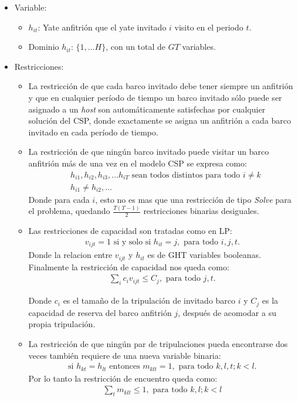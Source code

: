 \documentclass[letter, 10pt]{article}
\begin{document}
\begin{itemize}
    \item Variable:
    \begin{itemize}
        \item $h_{it}$: Yate anfitrión que el yate invitado $i$ visito en el periodo $t$.
        \item Dominio $h_{it}$: $\{1,\ldots H \}$, con un total de $GT$ variables.
    \end{itemize}
    \item Restricciones:
    \begin{itemize}
        \item La restricción de que cada barco invitado debe tener siempre un anfitrión y que en cualquier período de tiempo un barco invitado sólo puede ser asignado a un \textit{host} son automáticamente satisfechas por cualquier solución del CSP, donde exactamente se asigna un anfitrión a cada barco invitado en cada período de tiempo.
        \item La restricción de que ningún barco invitado puede visitar un barco anfitrión más de una vez en el modelo CSP se expresa como:
        \begin{align*}
            &h_{i1},h_{i2},h_{i3},\ldots h_{iT} \text{ sean todos distintos para todo } i\neq k \\
            &h_{i1} \neq h_{i2}, \ldots 
        \end{align*}
        Donde para cada $i$, esto no es mas que una restricción de tipo \textit{Solve} para el problema, quedando $\displaystyle\frac{T(T-1)}{2}$  restricciones binarias desiguales.
        \item Las restricciones de capacidad son tratadas como en LP:
        \begin{align*}
            v_{ijt} = 1 \text{ si y solo si } h_{it} = j, \text{ para todo } i,j,t.
        \end{align*}
        Donde la relacion entre $v_{ijt}$ y $h_{it}$ es de GHT variables booleanas. Finalmente la restricción de capacidad nos queda como:
        \begin{align*}
            \sum_{i} c_{i}v_{ijt} \leq C_j, \text{ para todo } j,t.
        \end{align*}
        
        Donde $c_i$ es el tamaño de la tripulación de invitado barco $i$ y $C_j$ es la capacidad de reserva del barco anfitrión $j$, después de acomodar a su propia tripulación.
        
        \item La restricción de que ningún par de tripulaciones pueda encontrarse dos veces también requiere de una nueva variable binaria:
        \begin{align*}
            \text{si } h_{kt} = h_{lt} \text{ entonces } m_{klt} = 1, \text{ para todo } k,l,t; k<l.
        \end{align*}
        Por lo tanto la restricción de encuentro queda como:
        \begin{align*}
            \sum_{t} m_{klt} \leq 1 ,\text{ para todo } k,l;k<l
        \end{align*}
    \end{itemize}
\end{itemize}
\end{document}
